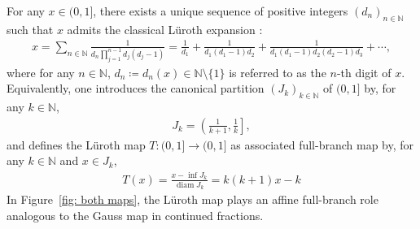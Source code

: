 \documentclass[12pt,reqno]{amsart}
\theoremstyle{definition}
\theoremstyle{plain}
\begin{document}
For any $x\in(0,1]$, there exists a unique sequence of positive integers $(d_n)_{n\in\mathbb{N}}$ such that $x$  admits the classical L\"uroth expansion \cite{Luroth1883Expansion}:
\begin{align*}
    x=\sum_{n\in\mathbb{N}}\frac{1}{d_n\prod_{j=1}^{n-1}d_j(d_j-1)}=\frac{1}{d_1}+\frac{1}{d_1(d_1-1)d_2}+\frac{1}{d_1(d_1-1)d_2(d_2-1)d_3}+\cdots,
\end{align*}
where for any $n\in\mathbb{N}$, $d_n\coloneqq d_n(x)\in\mathbb{N}\setminus\{1\}$ is referred to as the $n$-th digit of $x$. Equivalently, one introduces the canonical partition $(J_k)_{k\in\mathbb N}$ of $(0,1]$ by, for any $k\in\mathbb{N}$,
\begin{align*}
    J_k=\left(\frac{1}{k+1},\frac{1}{k}\right],
\end{align*}
and defines the L\"uroth map $T:(0,1]\to(0,1]$ as associated full-branch map by, for any $k\in\mathbb{N}$ and $x\in J_k$,
\begin{align*}
    T(x)
    =\frac{x-\inf J_k}{\operatorname{diam}{J_k}}
    =k(k+1)x-k
\end{align*}
In Figure~\ref{fig: both maps}, the L\"uroth map plays an affine full-branch role analogous to the Gauss map in continued fractions.
\end{document}
